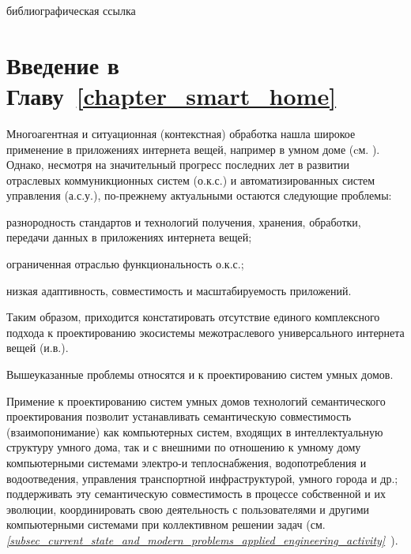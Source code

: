 \begin{SCn}
	\bigskip
	
	\begin{scnrelfromlist}{библиографическая ссылка}
	\end{scnrelfromlist}	
\end{SCn}

\section*{Введение в Главу~\ref{chapter_smart_home}}

Многоагентная и ситуационная (контекстная) обработка нашла широкое применение в приложениях интернета вещей, например в умном доме (cм. ). Однако, несмотря на значительный прогресс последних лет в развитии отраслевых коммуникционных систем (о.к.с.) и автоматизированных систем управления (а.с.у.), по-прежнему актуальными остаются следующие проблемы:
\begin{textitemize}
	\item разнородность стандартов и технологий получения, хранения, обработки, передачи данных в приложениях интернета вещей;
	\item ограниченная отраслью функциональность о.к.с.;
	\item низкая адаптивность, совместимость и масштабируемость приложений.
\end{textitemize}

Таким образом, приходится констатировать отсутствие единого комплексного подхода к проектированию экосистемы межотраслевого универсального интернета вещей (и.в.).

Вышеуказанные проблемы относятся и к проектированию систем умных домов.

Примение к проектированию систем умных домов технологий семантического проектирования позволит устанавливать семантическую совместимость (взаимопонимание)  как компьютерных систем, входящих в интеллектуальную структуру умного дома, так и с внешними по отношению к умному дому компьютерными системами электро-и теплоснабжения, водопотребления и водоотведения, управления транспортной инфраструктурой, умного города и др.; поддерживать эту семантическую совместимость в процессе собственной и их эволюции, координировать свою деятельность с пользователями и другими компьютерными системами при коллективном решении задач (см. \textit{\ref{subsec_current_state_and_modern_problems_applied_engineering_activity}~}).

